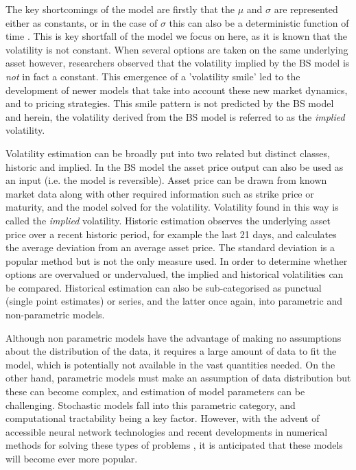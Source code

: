 \documentclass[12pt,oneside]{article}
\begin{document}
The key shortcomings of the model are firstly that the $\mu$ and $\sigma$ are represented either as constants, or in the case of $\sigma$ this can also be a deterministic function of time \cite{BlackScholes1973, gatheral2014volatility}. This is key shortfall of the model we focus on here, as it is known that the volatility is not constant. %
When several options are taken on the same underlying asset however, researchers observed that the volatility implied by the BS model is \emph{not} in fact a constant. This emergence of a 'volatility smile' led to the development of newer models that take into account these new market dynamics, and to pricing strategies. This smile pattern is not predicted by the BS model and herein, the volatility derived from the BS model is referred to as the \emph{implied} volatility. 

Volatility estimation can be broadly put into two related but distinct classes, historic and implied. In the BS model the asset price output can also be used as an input (i.e. the model is reversible). Asset price can be drawn from known market data along with other required information such as strike price or maturity, and the model solved for the volatility. Volatility found in this way is called the \emph{implied} volatility.
Historic estimation observes the underlying asset price over a recent historic period, for example the last 21 days, and calculates the average deviation from an average asset price. The standard deviation is a popular method but is not the only measure used. In order to determine whether options are overvalued or undervalued, the implied and historical volatilities can be compared. Historical estimation can also be sub-categorised as punctual (single point estimates) or series, and the latter once again, into parametric and non-parametric models. 

Although non parametric models have the advantage of making no assumptions about the distribution of the data, it requires a large amount of data to fit the model, which is potentially not available in the vast quantities needed. On the other hand, parametric models must make an assumption of data distribution but these can become complex, and estimation of model parameters can be challenging. Stochastic models fall into this parametric category, and computational tractability being a key factor. However, with the advent of accessible neural network technologies and recent developments in numerical methods for solving these types of problems \cite{horvath2019functional}, it is anticipated that these models will become ever more popular.
\end{document}
